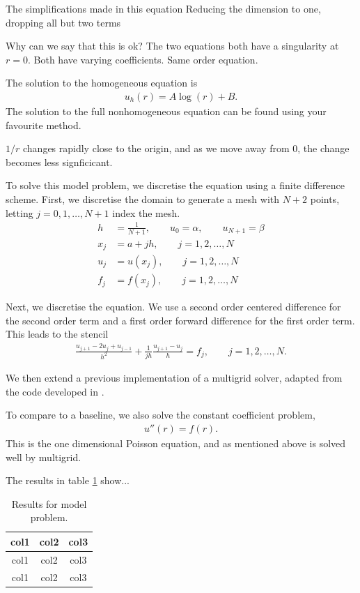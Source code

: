 The simplifications made in this equation
Reducing the dimension to one, dropping all but two terms

Why can we say that this is ok?
The two equations both have a singularity at $r=0$.
Both have varying coefficients.
Same order equation.


The solution to the homogeneous equation is 
\begin{align}
	u_h(r) = A \log(r) + B.
\end{align}
The solution to the full nonhomogeneous equation can be found using your favourite method.

$1/r$ changes rapidly close to the origin, and as we move away from 0, the change becomes less signficicant.

To solve this model problem, we discretise the equation using a finite difference scheme.
First, we discretise the domain to generate a mesh with $N+2$ points, letting $j=0,1,\ldots,N+1$ index the mesh.
\begin{align}
	h &= \frac{1}{N+1}, \qquad u_0 = \alpha, \qquad u_{N+1} = \beta \\
	x_j &= a + jh, \qquad j=1,2,\ldots,N \\
	u_j &= u(x_j), \qquad j=1,2,\ldots,N \\
	f_j &= f(x_j), \qquad j=1,2,\ldots,N
\end{align}

Next, we discretise the equation.
We use a second order centered difference for the second order term and a first order forward difference for the first order term.
This leads to the stencil
\begin{align}
	\frac{u_{j+1} - 2u_{j} + u_{j-1}}{h^2} + \frac{1}{jh}\frac{u_{j+1}-u_{j}}{h} = f_j, \qquad j=1,2,\ldots,N.
\end{align}


We then extend a previous implementation of a multigrid solver, adapted from the code developed in \cite{weir}.

To compare to a baseline, we also solve the constant coefficient problem,
\begin{align}
	u''(r) = f(r).
\end{align}
This is the one dimensional Poisson equation, and as mentioned above is solved well by multigrid.

The results in table \ref{tab:model} show...

\begin{table}[h]
	\centering
	\begingroup
	\renewcommand*{\arraystretch}{1.5}
	\begin{tabular}{c|c|c}
		col1 & col2 & col3 \\ \hline
		col1 & col2 & col3 \\
		col1 & col2 & col3 \\
	\end{tabular}
	\endgroup
	\caption{Results for model problem. \label{tab:model}}
\end{table}

